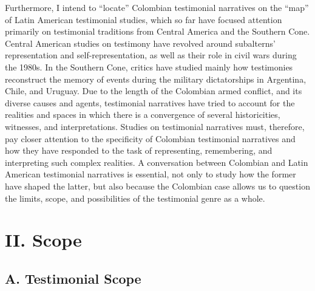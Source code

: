 \documentclass[
  11pt,
,
onecolumn,
openany
]{book}
\begin{document}
Furthermore, I intend to ``locate'' Colombian testimonial narratives on the
``map'' of Latin American testimonial studies, which so far have focused
attention primarily on testimonial traditions from Central America and the
Southern Cone. Central American studies on testimony have revolved around
subalterns' representation and self-representation, as well as their role in
civil wars during the 1980s. In the Southern Cone, critics have studied mainly
how testimonies reconstruct the memory of events during the military
dictatorships in Argentina, Chile, and Uruguay. Due to the length of the
Colombian armed conflict, and its diverse causes and agents, testimonial
narratives have tried to account for the realities and spaces in which there
is a convergence of several historicities, witnesses, and interpretations.
Studies on testimonial narratives must, therefore, pay closer attention to the
specificity of Colombian testimonial narratives and how they have responded to
the task of representing, remembering, and interpreting such complex
realities. A conversation between Colombian and Latin American testimonial
narratives is essential, not only to study how the former have shaped the
latter, but also because the Colombian case allows us to question the limits,
scope, and possibilities of the testimonial genre as a whole.

\hypertarget{ii.-scope}{%
\chapter{II. Scope}\label{ii.-scope}}

\hypertarget{a.-testimonial-scope}{%
\section{A. Testimonial Scope}\label{a.-testimonial-scope}}
\end{document}
